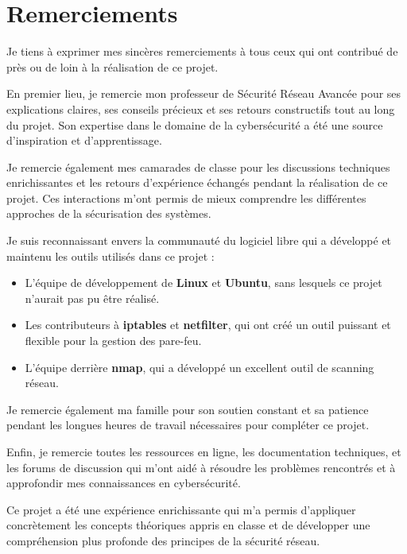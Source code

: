 \chapter*{Remerciements}

Je tiens à exprimer mes sincères remerciements à tous ceux qui ont contribué de près ou de loin à la réalisation de ce projet.

En premier lieu, je remercie mon professeur de Sécurité Réseau Avancée pour ses explications claires, ses conseils précieux et ses retours constructifs tout au long du projet. Son expertise dans le domaine de la cybersécurité a été une source d'inspiration et d'apprentissage.

Je remercie également mes camarades de classe pour les discussions techniques enrichissantes et les retours d'expérience échangés pendant la réalisation de ce projet. Ces interactions m'ont permis de mieux comprendre les différentes approches de la sécurisation des systèmes.

Je suis reconnaissant envers la communauté du logiciel libre qui a développé et maintenu les outils utilisés dans ce projet :
\begin{itemize}
    \item L'équipe de développement de \textbf{Linux} et \textbf{Ubuntu}, sans lesquels ce projet n'aurait pas pu être réalisé.
    \item Les contributeurs à \textbf{iptables} et \textbf{netfilter}, qui ont créé un outil puissant et flexible pour la gestion des pare-feu.
    \item L'équipe derrière \textbf{nmap}, qui a développé un excellent outil de scanning réseau.
\end{itemize}

Je remercie également ma famille pour son soutien constant et sa patience pendant les longues heures de travail nécessaires pour compléter ce projet.

Enfin, je remercie toutes les ressources en ligne, les documentation techniques, et les forums de discussion qui m'ont aidé à résoudre les problèmes rencontrés et à approfondir mes connaissances en cybersécurité.

Ce projet a été une expérience enrichissante qui m'a permis d'appliquer concrètement les concepts théoriques appris en classe et de développer une compréhension plus profonde des principes de la sécurité réseau.
